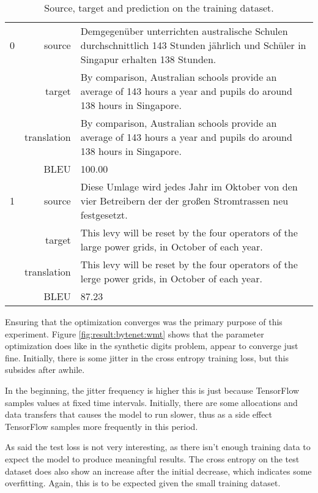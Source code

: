 \begin{table}[h]
\centering
\begin{tabular}{l|r|p{10cm}}
  0 & source & Demgegenüber unterrichten australische Schulen durchschnittlich 143 Stunden jährlich und Schüler in Singapur erhalten 138 Stunden. \\[0.1cm]
    & target & By comparison, Australian schools provide an average of 143 hours a year and pupils do around 138 hours in Singapore. \\[0.1cm]
    & translation & By comparison, Australian schools provide an average of 143 hours a year and pupils do around 138 hours in Singapore. \\[0.1cm]
    & BLEU & 100.00 \\[0.1cm] \hline
  1 & source & Diese Umlage wird jedes Jahr im Oktober von den vier Betreibern der der großen Stromtrassen neu festgesetzt. \\[0.1cm]
    & target & This levy will be reset by the four operators of the large power grids, in October of each year. \\[0.1cm]
    & translation & This levy will be reset by the four operators of the lerge power grids, in October of each year. \\[0.1cm]
    & BLEU & 87.23
\end{tabular}
\caption{Source, target and prediction on the training dataset.}
\label{table:result:bytenet:wmt-train}
\end{table}

Ensuring that the optimization converges was the primary purpose of this experiment. Figure \ref{fig:result:bytenet:wmt} shows that the parameter optimization does like in the synthetic digits problem, appear to converge just fine. Initially, there is some jitter in the cross entropy training loss, but this subsides after awhile.

In the beginning, the jitter frequency is higher this is just because TensorFlow samples values at fixed time intervals. Initially, there are some allocations and data transfers that causes the model to run slower, thus as a side effect TensorFlow samples more frequently in this period. 

As said the test loss is not very interesting, as there isn't enough training data to expect the model to produce meaningful results. The cross entropy on the test dataset does also show an increase after the initial decrease, which indicates some overfitting. Again, this is to be expected given the small training dataset.

